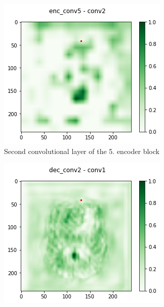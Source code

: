 \begin{figure}[H]
    \begin{subfigure}{.33\textwidth}
        \centering
        \includegraphics[width=\linewidth]{chapters/04_segmentation/images/grad_cam_17.png}
        \caption{Second convolutional layer of the 5. encoder block}
    \end{subfigure}\hfill%
    \begin{subfigure}{.32\textwidth}
        \centering
        \includegraphics[width=\linewidth]{chapters/04_segmentation/images/grad_cam_24.png}

\end{subfigure}
\end{figure}
